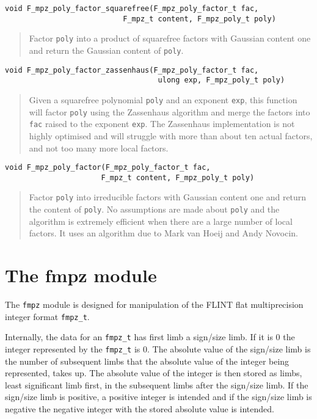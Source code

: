 \documentclass[a4paper,10pt]{article}
\newcommand{\code}{\lstinline}
\begin{document}
\begin{lstlisting}
void F_mpz_poly_factor_squarefree(F_mpz_poly_factor_t fac, 
                           F_mpz_t content, F_mpz_poly_t poly)
\end{lstlisting}
\begin{quote}
Factor \code{poly} into a product of squarefree factors with Gaussian content one and return the Gaussian
content of \code{poly}.
\end{quote}

\begin{lstlisting}
void F_mpz_poly_factor_zassenhaus(F_mpz_poly_factor_t fac,
                                   ulong exp, F_mpz_poly_t poly)
\end{lstlisting}
\begin{quote}
Given a squarefree polynomial \code{poly} and an exponent \code{exp}, this function will factor \code{poly}
using the Zassenhaus algorithm and merge the factors into \code{fac} raised to the exponent \code{exp}. The 
Zassenhaus implementation is not highly optimised and will struggle with more than about ten actual factors, 
and not too many more local factors.
\end{quote}

\begin{lstlisting}
void F_mpz_poly_factor(F_mpz_poly_factor_t fac, 
		              F_mpz_t content, F_mpz_poly_t poly)
\end{lstlisting}
\begin{quote}
Factor \code{poly} into irreducible factors with Gaussian content one and return the content of \code{poly}.
No assumptions are made about \code{poly} and the algorithm is extremely efficient when there are a large
number of local factors. It uses an algorithm due to Mark van Hoeij and Andy Novocin.
\end{quote}

\section{The fmpz module}
The \code{fmpz} module is designed for manipulation of the FLINT flat multiprecision integer format \code{fmpz_t}. 

Internally, the data for an \code{fmpz_t} has first limb a sign/size limb. If it is 0 the integer represented by the \code{fmpz_t} is 0. The absolute value of the sign/size limb is the number of subsequent limbs that the absolute value of the integer being represented, takes up. The absolute value of the integer is then stored as limbs, least significant limb first, in the subsequent limbs after the sign/size limb. If the sign/size limb is positive, a positive integer is intended and if the sign/size limb is negative the negative integer with the stored absolute value is intended.
\end{document}
